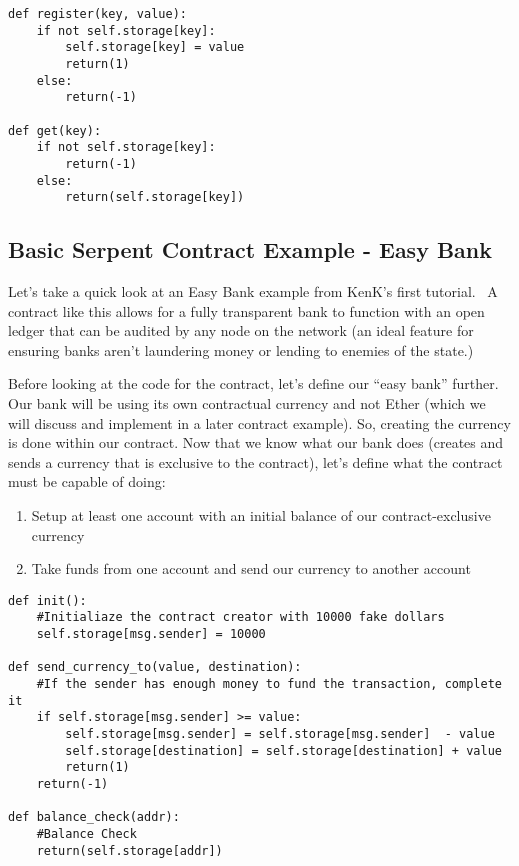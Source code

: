 \documentclass[12pt]{article}
\begin{document}
\begin{mdframed}
\begin{verbatim}
def register(key, value):
	if not self.storage[key]:
		self.storage[key] = value
		return(1)
	else:
		return(-1)

def get(key):
	if not self.storage[key]:
		return(-1)
	else:
		return(self.storage[key])
\end{verbatim}
\end{mdframed}

\subsection{Basic Serpent Contract Example - Easy Bank}
Let's take a quick look at an Easy Bank example from KenK's first tutorial.~\cite{KenKsFirstContractTutorial} A contract like this allows for a fully transparent bank to function with an open ledger that can be audited by any node on the network (an ideal feature for ensuring banks aren't laundering money or lending to enemies of the state.)

Before looking at the code for the contract, let's define our ``easy bank'' further. Our bank will be using its own contractual currency and not Ether (which we will discuss and implement in a later contract example). So, creating the currency is done within our contract. Now that we know what our bank does (creates and sends a currency that is exclusive to the contract), let's define what the contract must be capable of doing:
\begin{enumerate}
\item Setup at least one account with an initial balance of our contract-exclusive currency
\item Take funds from one account and send our currency to another account
\end{enumerate}


\begin{mdframed}
\begin{verbatim}
def init():
	#Initialiaze the contract creator with 10000 fake dollars
	self.storage[msg.sender] = 10000

def send_currency_to(value, destination):
	#If the sender has enough money to fund the transaction, complete it
	if self.storage[msg.sender] >= value:
		self.storage[msg.sender] = self.storage[msg.sender]  - value
		self.storage[destination] = self.storage[destination] + value
		return(1)
	return(-1)

def balance_check(addr):
	#Balance Check
	return(self.storage[addr])
\end{verbatim}
\end{mdframed}
		
\end{document}
